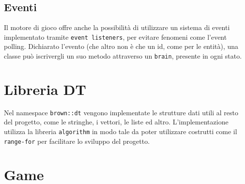 \documentclass{article}
\begin{document}
\subsection{Eventi}

Il motore di gioco offre anche la possibilità di utilizzare un sistema di eventi implementato tramite \verb|event listeners|, per evitare fenomeni come l'event polling. Dichiarato l'evento (che altro non è che un id, come per le entità), una classe può iscrivergli un suo metodo attraverso un \verb|brain|, presente in ogni stato.

\section{Libreria DT}
Nel namespace \verb|brown::dt| vengono implementate le strutture dati utili al resto del progetto, come le stringhe, i vettori, le liste ed altro. L'implementazione utilizza la libreria \verb|algorithm| in modo tale da poter utilizzare costrutti come il \verb|range-for| per facilitare lo sviluppo del progetto.

\section{Game}
\end{document}
